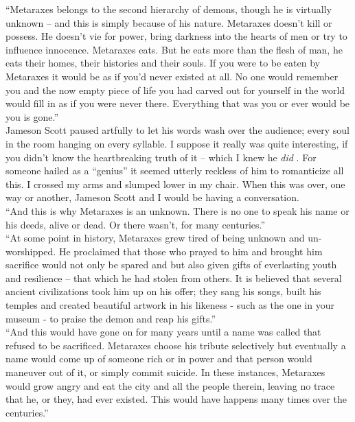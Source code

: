 \documentclass[a5paper]{scrartcl}
\begin{document}
\enquote{Metaraxes  belongs to the second hierarchy of demons, though he is virtually unknown -- and this is simply because of his nature. Metaraxes doesn't kill or possess. He doesn't vie for power, bring darkness into the hearts of men or try to influence innocence.  Metaraxes eats. But he eats more than the flesh of man, he eats their homes, their histories and their souls. If you were to be eaten by Metaraxes it would be as if you'd never existed at all. No one would remember you and the now empty piece of life you had carved out for yourself in the world would fill in as if you were never there. Everything that was you or ever would be you is gone.}\\


Jameson Scott paused artfully to let his words wash over the audience; every soul in the room hanging on every syllable. I suppose it really was quite interesting, if you didn't know the heartbreaking truth of it -- which I knew he \textit{did}
. For someone hailed as a \enquote{genius} it seemed utterly reckless of him to romanticize all this.  I crossed my arms and slumped lower in my chair. When this was over, one way or another, Jameson Scott and I would be having a conversation. \\


\enquote{And this is why Metaraxes is an unknown. There is no one to speak his name or his deeds, alive or dead. Or there wasn't, for many centuries.}\\


\enquote{At some point in history, Metaraxes grew tired of being unknown and un-worshipped. He proclaimed that those who prayed to him and brought him sacrifice would not only be spared and but also given gifts of everlasting youth and resilience -- that which he had stolen from others. It is believed that several ancient civilizations took him up on his offer; they sang his songs, built his temples and created beautiful artwork in his likeness - such as the one in your museum - to praise the demon and reap his gifts.}\\


\enquote{And this would have gone on for many years until a name was called that refused to be sacrificed. Metaraxes choose his tribute selectively but eventually a name would come up of someone rich or in power and that person would maneuver out of it, or simply commit suicide. In these instances, Metaraxes would grow angry and eat the city and all the people therein, leaving no trace that he, or they, had ever existed. This would have happens many times over the centuries.}\\
\end{document}

